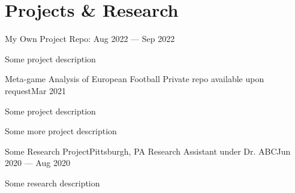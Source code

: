 \section{Projects \& Research}
\resumeSectionStart

    \resumeSubheading
        {My Own Project}{}
        {Repo: }{Aug 2022 --- Sep 2022}
    \resumeItemListStart
        \item Some project description 
    \resumeItemListEnd

    \resumeSubheading
        {Meta-game Analysis of European Football}{}
        {Private repo available upon request}{Mar 2021}

    \resumeItemListStart
        \item Some project description 

        \item Some more project description

    \resumeItemListEnd

    \resumeSubheading
        {Some Research Project}{Pittsburgh, PA}
        {Research Assistant under Dr. ABC}{Jun 2020 --- Aug 2020}

    \resumeItemListStart
        \item Some research description 

    \resumeItemListEnd

\resumeSectionEnd
